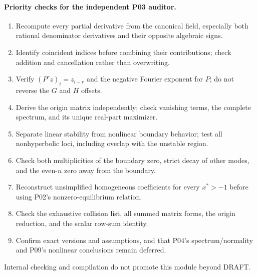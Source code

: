 \paragraph{Priority checks for the independent P03 auditor.}
\begin{enumerate}[label=(\arabic*),leftmargin=*]
\item Recompute every partial derivative from the canonical field,
especially both rational denominator derivatives and their opposite
algebraic signs.
\item Identify coincident indices before combining their contributions;
check addition and cancellation rather than overwriting.
\item Verify $(P^r z)_i=z_{i-r}$ and the negative Fourier exponent
for $P$; do not reverse the $G$ and $H$ offsets.
\item Derive the origin matrix independently; check vanishing terms,
the complete spectrum, and its unique real-part maximizer.
\item Separate linear stability from nonlinear boundary behavior;
test all nonhyperbolic loci, including overlap with the unstable region.
\item Check both multiplicities of the boundary zero, strict decay
of other modes, and the even-$n$ zero away from the boundary.
\item Reconstruct unsimplified homogeneous coefficients for every
$x^*>-1$ before using P02's nonzero-equilibrium relation.
\item Check the exhaustive collision list, all summed matrix forms,
the origin reduction, and the scalar row-sum identity.
\item Confirm exact versions and assumptions, and that P04's
spectrum/normality and P09's nonlinear conclusions remain deferred.
\end{enumerate}
Internal checking and compilation do not promote this module beyond DRAFT.
